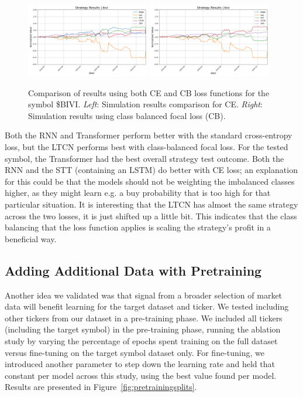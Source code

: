 \documentclass[10pt,twocolumn,letterpaper]{article}
\begin{document}
\begin{figure}[ht!]
    \centering
    \includegraphics[width=0.48\textwidth]{../figures/simulation_results_all_models_bivi_config_loss_ce.yml.png}
    \includegraphics[width=0.48\textwidth]{../figures/simulation_results_all_models_bivi_config_loss_cbfocal.yml.png} 
    \caption{Comparison of results using both CE and CB loss functions for the symbol \$BIVI. \emph{Left}: Simulation results comparison for CE. \emph{Right}: Simulation results using class balanced focal loss (CB).}
    \label{fig:ceVsCbLoss}
\end{figure}

Both the RNN and Transformer perform better with the standard cross-entropy loss, but the LTCN performs best with class-balanced focal loss. For the tested symbol, the Transformer had the best overall strategy test outcome. Both the RNN and the STT (containing an LSTM) do better with CE loss; an explanation for this could be that the models should not be weighting the imbalanced classes higher, as they might learn e.g. a buy probability that is too high for that particular situation. It is interesting that the LTCN has almost the same strategy across the two losses, it is just shifted up a little bit. This indicates that the class balancing that the loss function applies is scaling the strategy's profit in a beneficial way.

\subsection{Adding Additional Data with Pretraining}

Another idea we validated was that signal from a broader selection of market data will benefit learning for the target dataset and ticker. We tested including other tickers from our dataset in a pre-training phase. We included all tickers (including the target symbol) in the pre-training phase, running the ablation study by varying the percentage of epochs spent training on the full dataset versus fine-tuning on the target symbol dataset only. For fine-tuning, we introduced another parameter to step down the learning rate and held that constant per model across this study, using the best value found per model.  Results are presented in Figure~\ref{fig:pretrainingsplits}.
\end{document}
